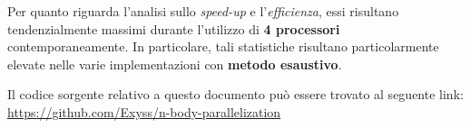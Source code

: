 \documentclass[12pt]{report}
\begin{document}
    Per quanto riguarda l'analisi sullo \textit{speed-up} e l'\textit{efficienza}, essi risultano tendenzialmente massimi durante l'utilizzo di \textbf{4 processori} contemporaneamente. In particolare, tali statistiche risultano particolarmente elevate nelle varie implementazioni con \textbf{metodo esaustivo}. 

    \quad

    Il codice sorgente relativo a questo documento può essere trovato al seguente link: \href{https://github.com/Exyss/n-body-parallelization}{https://github.com/Exyss/n-body-parallelization}
\end{document}
